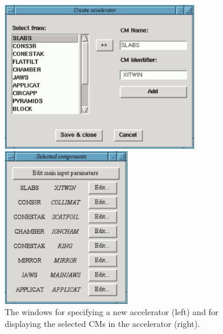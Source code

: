 \documentclass[12pt,twoside]{article}
\begin{document}
\begin{latexonly}
\begin{figure}[htbp]
\begin{center}
\begin{minipage}[t]{9cm}
    \leavevmode
    \includegraphics[width=8.5cm]{figures/add_cm}
\end{minipage}
\hfill
\begin{minipage}[t]{6cm}
    \leavevmode
    \includegraphics[width=5.5cm]{figures/cm_selected}
\end{minipage}
\end{center}
\caption{The windows for specifying a new accelerator (left) and for
displaying the selected CMs in the accelerator (right).\label{add_cm}}
\end{figure}
\end{latexonly}
\end{document}
